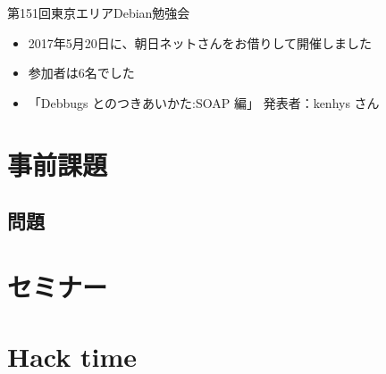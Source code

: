 \begin{frame}{第151回東京エリアDebian勉強会}
\begin{itemize}
\item 2017年5月20日に、朝日ネットさんをお借りして開催しました
\item 参加者は6名でした
\item 「Debbugs とのつきあいかた:SOAP 編」 発表者：kenhys さん
\end{itemize} 
\end{frame}

\section{事前課題}
{\footnotesize
 
}

\subsection{問題}


\section{セミナー}



\section{Hack time}

  
